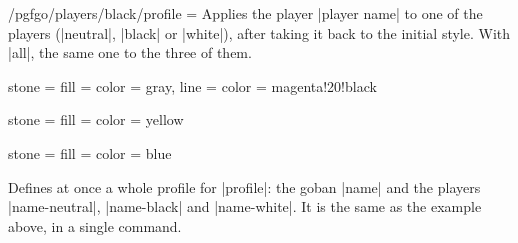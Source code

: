 \begin{goban}[9, stone = {radius = 4pt}, mark = {line = {color = red}}]
\begin{key}{/pgfgo/players/black/profile = }
	Applies the player |player name| to one of the players (|neutral|, |black| or |white|), after taking it back to the initial style. With |all|, the same one to the three of them.
	\begin{codeexample}
	\end{codeexample}
\end{key}

\begin{codeexample}[width=3cm]
	{stone = {
			fill = {color = gray},
			line = {color = magenta!20!black}}
	}
	
	{stone = {fill = {color = yellow}}}
	
	{stone = {fill = {color = blue}}}
	
	
	\begin{goban}[partial = A1:C3]
	\end{goban}
\end{codeexample}

\begin{command}{\pgfgodefineprofile{}}
	Defines at once a whole profile for |profile|: the goban |name| and the players |name-neutral|, |name-black| and |name-white|. It is the same as the example above, in a single command.

	\begin{codeexample}[width=3cm]


		\begin{goban}[partial = A1:C3]
		\end{goban}
	\end{codeexample}


\end{command}
\end{goban}
